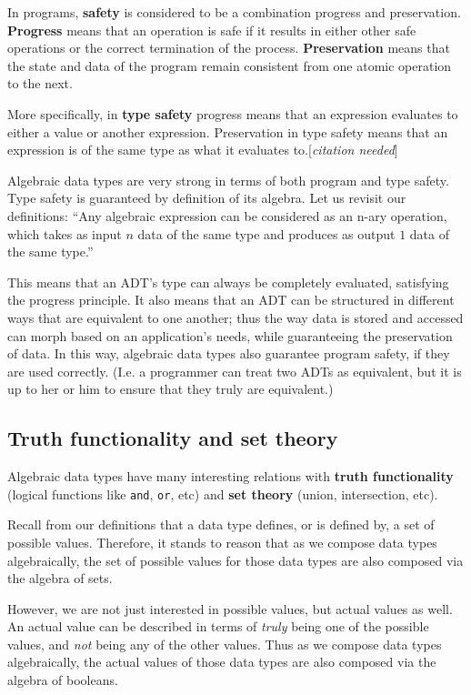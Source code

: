 \documentclass[12pt,a4paper]{article}
\newcommand{\citationNeeded}{[\textit{citation needed}]}
\begin{document}
		In programs, \textbf{safety} is considered to be a combination progress and preservation. \textbf{Progress} means that an operation is safe if it results in either other safe operations or the correct termination of the process. \textbf{Preservation} means that the state and data of the program remain consistent from one atomic operation to the next.
		
		More specifically, in \textbf{type safety} progress means that an expression evaluates to either a value or another expression. Preservation in type safety means that an expression is of the same type as what it evaluates to.\citationNeeded
		
		Algebraic data types are very strong in terms of both program and type safety. Type safety is guaranteed by definition of its algebra. Let us revisit our definitions: \textquotedblleft Any algebraic expression can be considered as an n-ary operation, which takes as input $n$ data of the same type and produces as output $1$ data of the same type.\textquotedblright 
		
		This means that an ADT's type can always be completely evaluated, satisfying the progress principle. It also means that an ADT can be structured in different ways that are equivalent to one another; thus the way data is stored and accessed can morph based on an application's needs, while guaranteeing the preservation of data. In this way, algebraic data types also guarantee program safety, if they are used correctly. (I.e. a programmer can treat two ADTs as equivalent, but it is up to her or him to ensure that they truly are equivalent.)
		
		
		\subsection{Truth functionality and set theory}
		
		Algebraic data types have many interesting relations with \textbf{truth functionality} (logical functions like \texttt{and}, \texttt{or}, etc) and \textbf{set theory} (union, intersection, etc).
		
		Recall from our definitions that a data type defines, or is defined by, a set of possible values. Therefore, it stands to reason that as we compose data types algebraically, the set of possible values for those data types are also composed via the algebra of sets.
		
		However, we are not just interested in possible values, but actual values as well. An actual value can be described in terms of \textit{truly} being one of the possible values, and \textit{not} being any of the other values. Thus as we compose data types algebraically, the actual values of those data types are also composed via the algebra of booleans.
		
\end{document}
